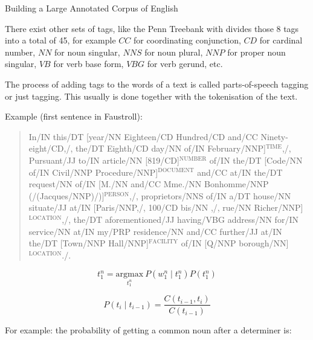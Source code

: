 Building a Large Annotated Corpus of English \citep{Marcus1993}

There exist other sets of tags, like the Penn Treebank with divides those 8 tags into a total of 45, for example $CC$ for coordinating conjunction, $CD$ for cardinal number, $NN$ for noun singular, $NNS$ for noun plural, $NNP$ for proper noun singular, $VB$ for verb base form, $VBG$ for verb gerund, etc.

The process of adding tags to the words of a text is called parts-of-speech tagging or just tagging. This usually is done together with the tokenisation of the text.

Example (first sentence in Faustroll):

\begin{quote}
  In\slash IN this\slash DT [year\slash NN Eighteen\slash CD Hundred\slash CD and\slash CC Ninety-eight\slash CD,\slash , the\slash DT Eighth\slash CD day\slash NN of\slash IN February\slash NNP]$^{\text{TIME}}$,\slash , Pursuant\slash JJ to\slash IN article\slash NN [819\slash  CD]$^{\text{NUMBER}}$ of\slash IN the\slash DT [Code\slash NN of\slash IN Civil\slash NNP Procedure\slash NNP]$^{\text{DOCUMENT}}$ and\slash CC at\slash IN the\slash DT request\slash NN of\slash IN [M.\slash NN and\slash CC Mme.\slash NN Bonhomme\slash NNP (\slash (Jacques\slash NNP)\slash )]$^{\text{PERSON}}$,\slash , proprietors\slash NNS of\slash IN a\slash DT house\slash NN situate\slash JJ at\slash IN [Paris\slash NNP,\slash , 100\slash CD bis\slash NN ,\slash , rue\slash NN Richer\slash NNP]$^{\text{LOCATION}}$,\slash , the\slash DT aforementioned\slash JJ having\slash VBG address\slash NN for\slash IN service\slash NN at\slash IN my\slash PRP residence\slash NN and\slash CC further\slash JJ at\slash IN the\slash DT [Town\slash NNP Hall\slash NNP]$^{\text{FACILITY}}$ of\slash IN [Q\slash NNP borough\slash NN]$^{\text{LOCATION}}$.\slash .
\end{quote}

\begin{equation}
  t_1^n = \underset{t_1^n}{\text{argmax}} \ P(w_1^n \mid t_1^n) P(t_1^n)
  \label{eq:tn1}
\end{equation}

\begin{equation}
  P(t_i \mid t_{i-1}) = \frac{C(t_{i-1},t_i)}{C(t_{i-1})}
  \label{eq:pti}
\end{equation}

For example: the probability of getting a common noun after a determiner is:

